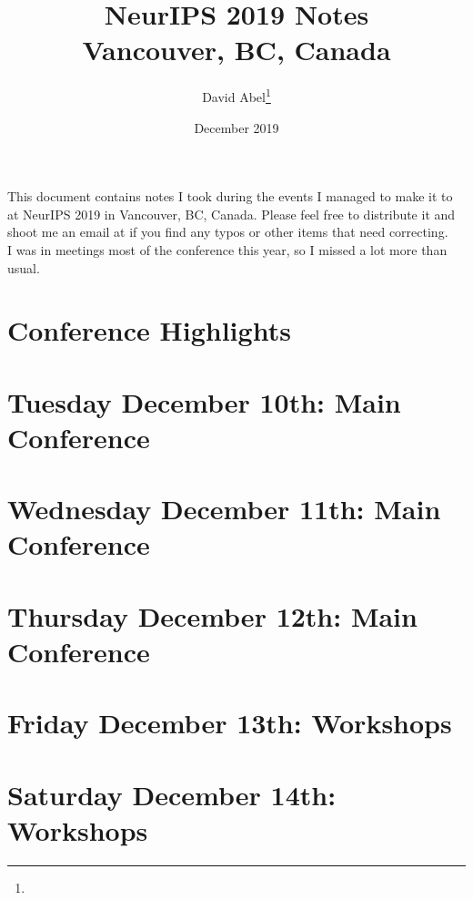 \documentclass[11pt]{article}
\title{NeurIPS 2019 Notes \\ \Large{Vancouver, BC, Canada}}
\author{David Abel\footnote{\durl{http://david-abel.github.io}} \\ \durl{david_abel@brown.edu}}
\date{December 2019}
\begin{document}
\maketitle
\tableofcontents
\newpage


This document contains notes I took during the events I managed to make it to at NeurIPS 2019 in Vancouver, BC, Canada. Please feel free to distribute it and shoot me an email at  if you find any typos or other items that need correcting. \\

I was in meetings most of the conference this year, so I missed a lot more than usual. \\


\section{Conference Highlights}




% 



\newpage
\section{Tuesday December 10th: Main Conference}




\newpage
\section{Wednesday December 11th: Main Conference}



\newpage
\section{Thursday December 12th: Main Conference}



\newpage
\section{Friday December 13th: Workshops}



\newpage
\section{Saturday December 14th: Workshops}





\newpage


\end{document}
